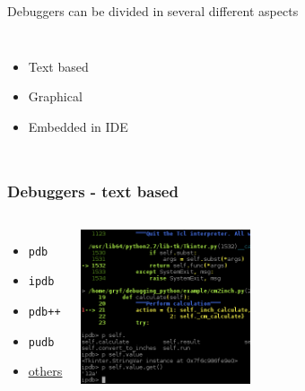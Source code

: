 \documentclass[14pt,notes,svgnames]{beamer}
\begin{document}
\begin{frame}
    Debuggers can be divided in several different aspects

    \begin{columns}
        \begin{itemize}[<+->]
            \item<1,2,3> Text based
            \item<2,3> Graphical
            \item<3> Embedded in IDE
        \end{itemize}
    \end{columns}
\end{frame}

\begin{frame}
    \frametitle{Debuggers - text based}
    \begin{columns}
        \begin{itemize}
            \item \lstinline{pdb}
            \item \lstinline{ipdb}
            \item \lstinline{pdb++}
            \item \lstinline{pudb}
            \item \color{blue}\href{https://wiki.python.org/moin/PythonDebuggingTools}{\uline{others}}
        \end{itemize}

        \vspace*{0cm}
        \hspace*{0cm}\includegraphics[width=5cm]{"images/ipdb.png"}

    \end{columns}
\end{frame}
\end{document}
